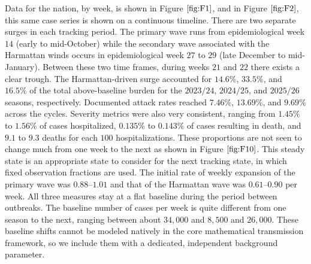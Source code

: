 \documentclass[12pt,a4paper]{article}
\theoremstyle{definition}
\theoremstyle{remark}
\begin{document}
Data for the nation, by week, is shown in Figure$~\ref{fig:F1}$, and in Figure$~\ref{fig:F2}$, this same case series is shown on a continuous timeline. There are two separate surges in each tracking period. The primary wave runs from epidemiological week $14$ (early to mid-October) while the secondary wave associated with the Harmattan winds occurs in epidemiological week $27$ to $29$ (late December to mid-January). Between these two time frames, during weeks $21$ and $22$ there exists a clear trough.
The Harmattan-driven surge accounted for $14.6\%$, $33.5\%$, and $16.5\%$ of the total above-baseline burden for the $2023/24$, $2024/25$, and $2025/26$ seasons, respectively. Documented attack rates reached $7.46\%$, $13.69\%$, and $9.69\%$ across the cycles. Severity metrics were also very consistent, ranging from $1.45\%$ to $1.56\%$ of cases hospitalized, $0.135\%$ to $0.143\%$ of cases resulting in death, and $9.1$ to $9.3$ deaths for each $100$ hospitalizations.
These proportions are not seen to change much from one week to the next as shown in Figure$~\ref{fig:F10}$. This steady state is an appropriate state to consider for the next tracking state, in which fixed observation fractions are used. The initial rate of weekly expansion of the primary wave was $0.88$--$1.01$ and that of the Harmattan wave was $0.61$--$0.90$ per week. All three measures stay at a flat baseline during the period between outbreaks. The baseline number of cases per week is quite different from one season to the next, ranging between about $34{,}000$ and $8{,}500$ and $26{,}000$. These baseline shifts cannot be modeled natively in the core mathematical transmission framework, so we include them with a dedicated, independent background parameter.
\end{document}
